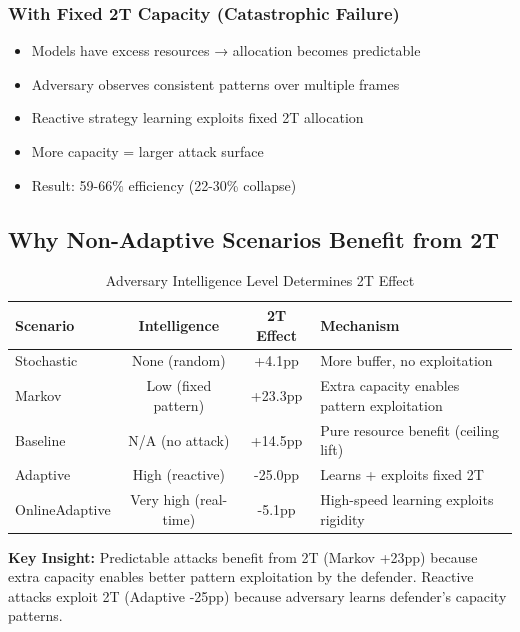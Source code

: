 \documentclass[11pt,a4paper]{article}
\begin{document}
\subsubsection{With Fixed 2T Capacity (Catastrophic Failure)}
\begin{itemize}
\item Models have excess resources → allocation becomes predictable
\item Adversary observes consistent patterns over multiple frames
\item Reactive strategy learning exploits fixed 2T allocation
\item More capacity = larger attack surface
\item Result: 59-66\% efficiency (22-30\% collapse)
\end{itemize}

\subsection{Why Non-Adaptive Scenarios Benefit from 2T}

\vspace{-0.4cm}

\begin{table}[h]
\scriptsize
\centering
\begin{tabular}{lccl}
\toprule
\textbf{Scenario} & \textbf{Intelligence} & \textbf{2T Effect} & \textbf{Mechanism} \\
\midrule
Stochastic & None (random) & +4.1pp & More buffer, no exploitation \\
Markov & Low (fixed pattern) & +23.3pp & Extra capacity enables pattern exploitation \\
Baseline & N/A (no attack) & +14.5pp & Pure resource benefit (ceiling lift) \\
Adaptive & High (reactive) & -25.0pp & Learns + exploits fixed 2T \\
OnlineAdaptive & Very high (real-time) & -5.1pp & High-speed learning exploits rigidity \\
\bottomrule
\end{tabular}
\vspace{-0.2cm}
\caption{Adversary Intelligence Level Determines 2T Effect}
\end{table}

\vspace{-0.2cm}

\textbf{Key Insight:} Predictable attacks benefit from 2T (Markov +23pp) because extra capacity enables better pattern exploitation by the defender. Reactive attacks exploit 2T (Adaptive -25pp) because adversary learns defender's capacity patterns.
\end{document}
